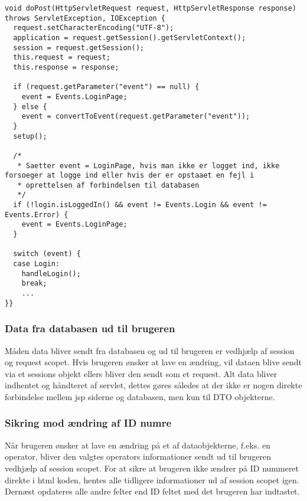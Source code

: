 \documentclass[a4paper]{article}
\newenvironment{changemargin}[2]{%
\begin{list}{}{%
\setlength{\topsep}{0pt}%
\setlength{\leftmargin}{#1}%
\setlength{\rightmargin}{#2}%
\setlength{\listparindent}{\parindent}%
\setlength{\itemindent}{\parindent}%
\setlength{\parsep}{\parskip}%
}%
\item[]}{\end{list}}
\begin{document}
\begin{changemargin}{-1.5cm}{-1.5c}
\begin{lstlisting}
void doPost(HttpServletRequest request, HttpServletResponse response) throws ServletException, IOException {
  request.setCharacterEncoding("UTF-8");
  application = request.getSession().getServletContext();
  session = request.getSession();
  this.request = request;
  this.response = response;

  if (request.getParameter("event") == null) {
    event = Events.LoginPage;
  } else {
    event = convertToEvent(request.getParameter("event"));
  }
  setup();

  /*
   * Saetter event = LoginPage, hvis man ikke er logget ind, ikke forsoeger at logge ind eller hvis der er opstaaet en fejl i
   * oprettelsen af forbindelsen til databasen
   */
  if (!login.isLoggedIn() && event != Events.Login && event != Events.Error) {
    event = Events.LoginPage;
  }

  switch (event) {
  case Login:
    handleLogin();
    break;
    ...
}}
\end{lstlisting}
\end{changemargin}


\subsubsection{Data fra databasen ud til brugeren} %

Måden data bliver sendt fra databasen og ud til brugeren er vedhjælp af session og request scopet. Hvis brugeren ønsker at lave en ændring, vil dataen blive sendt via et sessions objekt ellers bliver den sendt som et request.  Alt data bliver indhentet og håndteret af servlet, dettes gøres således at der ikke er nogen direkte forbindelse mellem jsp siderne og databasen, men kun til DTO objekterne.   


\subsubsection{Sikring mod ændring af ID numre} %

Når brugeren ønsker at lave en ændring på et af dataobjekterne, f.eks. en operator, bliver den valgtes operators informationer sendt ud til brugeren vedhjælp af session scopet. For at sikre at brugeren ikke ændrer på ID nummeret direkte i html koden, hentes alle tidligere informationer ud af session scopet igen.  Dernæst opdateres alle andre felter end ID feltet med det brugeren har indtastet.
\end{document}
